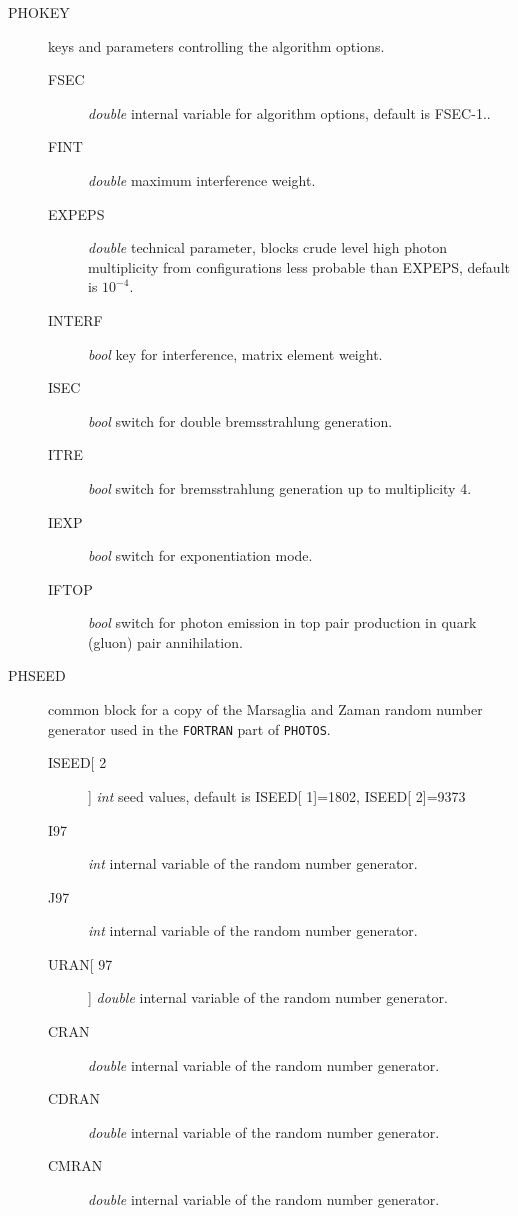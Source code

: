 \documentclass[]{Photos_interface_design}
\begin{document}
\begin{description}
\item[PHOKEY] keys and parameters controlling the algorithm options.
    \begin{description}
	\item[FSEC]   \textit{double} internal variable for algorithm options, default is FSEC-1..
	\item[FINT]   \textit{double} maximum interference weight.
	\item[EXPEPS] \textit{double} technical parameter, blocks crude level high photon multiplicity from configurations less probable than EXPEPS, default is $10^{-4}$.
	\item[INTERF] \textit{bool} key for interference, matrix element weight.
	\item[ISEC]   \textit{bool} switch for double bremsstrahlung generation.
	\item[ITRE]   \textit{bool} switch for bremsstrahlung generation up to multiplicity 4.
	\item[IEXP]   \textit{bool} switch for exponentiation mode.
	\item[IFTOP]  \textit{bool} switch for photon emission in top pair production in quark (gluon) pair annihilation.
    \end{description}
\end{description}

\begin{description}
\item[PHSEED] common block for a copy of the Marsaglia and Zaman random number generator used in the {\tt FORTRAN} part of {\tt PHOTOS}.
    \begin{description}
	\item[ISEED[ 2]]  \textit{int} seed values, default is  ISEED[ 1]=1802, ISEED[ 2]=9373
	\item[I97]        \textit{int} internal variable of the random number generator.
	\item[J97]        \textit{int} internal variable of the random number generator.
	\item[URAN[ 97]]  \textit{double} internal variable of the random number generator.
	\item[CRAN]       \textit{double} internal variable of the random number generator.
	\item[CDRAN]      \textit{double} internal variable of the random number generator.
	\item[CMRAN]      \textit{double} internal variable of the random number generator.
    \end{description}
\end{description}
\end{document}
